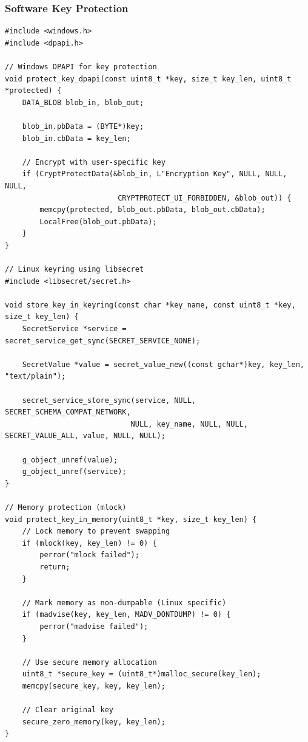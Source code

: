 \subsubsection{Software Key Protection}

\begin{lstlisting}[style=cstyle, caption={Software Key Protection}]
#include <windows.h>
#include <dpapi.h>

// Windows DPAPI for key protection
void protect_key_dpapi(const uint8_t *key, size_t key_len, uint8_t *protected) {
    DATA_BLOB blob_in, blob_out;
    
    blob_in.pbData = (BYTE*)key;
    blob_in.cbData = key_len;
    
    // Encrypt with user-specific key
    if (CryptProtectData(&blob_in, L"Encryption Key", NULL, NULL, NULL, 
                          CRYPTPROTECT_UI_FORBIDDEN, &blob_out)) {
        memcpy(protected, blob_out.pbData, blob_out.cbData);
        LocalFree(blob_out.pbData);
    }
}

// Linux keyring using libsecret
#include <libsecret/secret.h>

void store_key_in_keyring(const char *key_name, const uint8_t *key, size_t key_len) {
    SecretService *service = secret_service_get_sync(SECRET_SERVICE_NONE);
    
    SecretValue *value = secret_value_new((const gchar*)key, key_len, "text/plain");
    
    secret_service_store_sync(service, NULL, SECRET_SCHEMA_COMPAT_NETWORK,
                             NULL, key_name, NULL, NULL, SECRET_VALUE_ALL, value, NULL, NULL);
    
    g_object_unref(value);
    g_object_unref(service);
}

// Memory protection (mlock)
void protect_key_in_memory(uint8_t *key, size_t key_len) {
    // Lock memory to prevent swapping
    if (mlock(key, key_len) != 0) {
        perror("mlock failed");
        return;
    }
    
    // Mark memory as non-dumpable (Linux specific)
    if (madvise(key, key_len, MADV_DONTDUMP) != 0) {
        perror("madvise failed");
    }
    
    // Use secure memory allocation
    uint8_t *secure_key = (uint8_t*)malloc_secure(key_len);
    memcpy(secure_key, key, key_len);
    
    // Clear original key
    secure_zero_memory(key, key_len);
}
\end{lstlisting}

